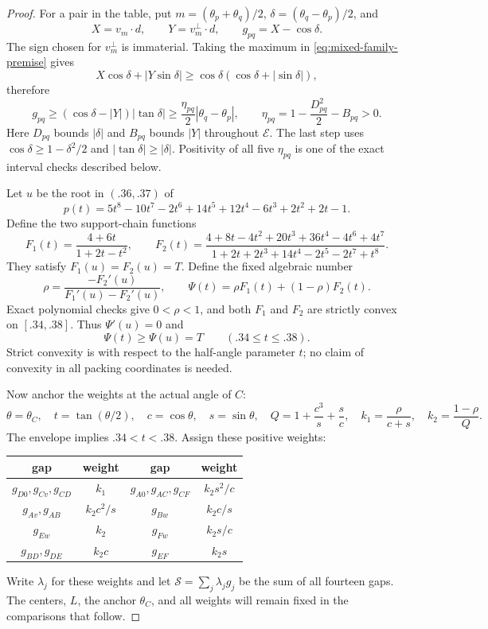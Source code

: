 \documentclass[11pt]{article}
\begin{document}
\begin{proof}
For a pair in the table, put
$m=(\theta_p+\theta_q)/2$, $\delta=(\theta_q-\theta_p)/2$, and
\[
 X=v_m\cdot d,\qquad Y=v_m^\perp\cdot d,\qquad
 g_{pq}=X-\cos\delta.
\]
The sign chosen for $v_m^\perp$ is immaterial. Taking the maximum in
\eqref{eq:mixed-family-premise} gives
\[
 X\cos\delta+|Y\sin\delta|
 \ge\cos\delta(\cos\delta+|\sin\delta|),
\]
therefore
\begin{equation}
 g_{pq}\ge(\cos\delta-|Y|)|\tan\delta|
 \ge\frac{\eta_{pq}}2|\theta_q-\theta_p|,
 \qquad
 \eta_{pq}=1-\frac{D_{pq}^2}{2}-B_{pq}>0.
 \label{eq:mixed-mismatch}
\end{equation}
Here $D_{pq}$ bounds $|\delta|$ and $B_{pq}$ bounds $|Y|$ throughout
$\mathcal E$. The last step uses $\cos\delta\ge1-\delta^2/2$ and
$|\tan\delta|\ge|\delta|$. Positivity of all five $\eta_{pq}$ is one
of the exact interval checks described below.

Let $u$ be the root in $(.36,.37)$ of
\[
 p(t)=5t^8-10t^7-2t^6+14t^5+12t^4-6t^3+2t^2+2t-1.
\]
Define the two support-chain functions
\[
 F_1(t)=\frac{4+6t}{1+2t-t^2},\qquad
 F_2(t)=\frac{4+8t-4t^2+20t^3+36t^4-4t^6+4t^7}
 {1+2t+2t^3+14t^4-2t^5-2t^7+t^8}.
\]
They satisfy $F_1(u)=F_2(u)=T$. Define the fixed algebraic number
\[
 \rho=\frac{-F_2'(u)}{F_1'(u)-F_2'(u)},\qquad
 \Psi(t)=\rho F_1(t)+(1-\rho)F_2(t).
\]
Exact polynomial checks give $0<\rho<1$, and both $F_1$ and $F_2$
are strictly convex on $[.34,.38]$. Thus $\Psi'(u)=0$ and
\begin{equation}
 \Psi(t)\ge\Psi(u)=T\qquad(.34\le t\le.38).
 \label{eq:mixed-scalar}
\end{equation}
Strict convexity is with respect to the half-angle parameter $t$;
no claim of convexity in all packing coordinates is needed.

Now anchor the weights at the actual angle of $C$:
\[
 \theta=\theta_C,\quad t=\tan(\theta/2),\quad
 c=\cos\theta,\quad s=\sin\theta,\quad
 Q=1+\frac{c^3}{s}+\frac{s}{c},\quad
 k_1=\frac{\rho}{c+s},\quad k_2=\frac{1-\rho}{Q}.
\]
The envelope implies $.34<t<.38$. Assign these positive weights:
\begin{center}
\begin{tabular}{c|c@{\qquad}c|c}
gap&weight&gap&weight\\ \hline
$g_{D0},g_{Cv},g_{CD}$&$k_1$
 &$g_{A0},g_{AC},g_{CF}$&$k_2s^2/c$\\
$g_{Av},g_{AB}$&$k_2c^2/s$
 &$g_{Bw}$&$k_2c/s$\\
$g_{Ew}$&$k_2$
 &$g_{Fw}$&$k_2s/c$\\
$g_{BD},g_{DE}$&$k_2c$
 &$g_{EF}$&$k_2s$
\end{tabular}
\end{center}
Write $\lambda_j$ for these weights and let
$\mathcal S=\sum_j\lambda_jg_j$ be the sum of all fourteen gaps.
The centers, $L$, the anchor $\theta_C$, and all weights will remain
fixed in the comparisons that follow.


\end{proof}
\end{document}
